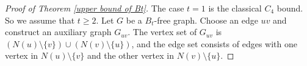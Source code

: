 \documentclass[11pt,a4paper]{article}
\theoremstyle{definition}
\begin{document}
\begin{proof}[Proof of Theorem \ref{upper bound of Bt}]
            The case $t = 1$ is the classical $C_4$ bound.
            So we assume that $t \geq 2$.
            Let $G$ be a $B_t$-free graph.
            Choose an edge $uv$ and construct an auxiliary graph $G_{uv}$.
            The vertex set of $G_{uv}$ is $(N(u) \setminus \{v\}) \cup (N(v) \setminus \{u\})$, and the edge set consists of edges with one vertex in $N(u) \setminus \{v\}$ and the other vertex in $N(v) \setminus \{u\}$.


\end{proof}
\end{document}
